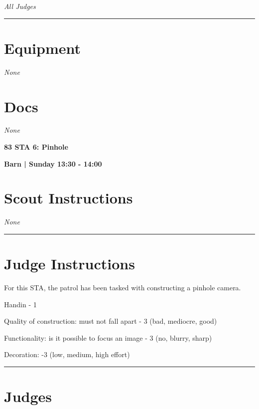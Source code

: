 \documentclass[10pt]{article}
\newcommand{\newtitle}[1]{\begin{center}{\Huge\bfseries #1 }\\ \vspace{5mm}\end{center}}
\newcommand{\newsubtitle}[1]{\begin{center}{\color{grey}\Large\bfseries #1 }\\ \vspace{5mm}\end{center}}
\begin{document}
					\textit{All Judges}
			\vspace{0.5cm}
	\hrule
	\vspace{0.5cm}

	\begin{multicols}{2}

		\section*{\faWrench \: Equipment}

				\textit{None}
		
		\vfill\null
		\columnbreak

			\section*{\faFile \: Docs}
		 	\textit{None}
	

		\vfill\null

		\end{multicols}



	\vspace{1cm}


	\clearpage
		\newtitle{83 STA 6: Pinhole }
	\newsubtitle{Barn | Sunday 13:30 - 14:00}
		\setcounter{section}{82}
	\section*{Scout Instructions}
		\textit{None}
	
	\vspace{0.5cm}
	\hrule
	\vspace{0.5cm}

		\section*{Judge Instructions}
		For this STA, the patrol has been tasked with constructing a pinhole camera. 



Handin - 1

Quality of construction: must not fall apart - 3 (bad, mediocre, good)

Functionality: is it possible to focus an image - 3 (no, blurry, sharp)

Decoration: -3 (low, medium, high effort)


\vspace{0.5cm}
	\hrule
	\vspace{0.5cm}
		\section*{\faUsers \: Judges}
\end{document}
